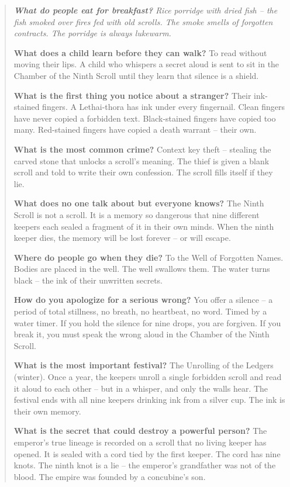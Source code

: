 \documentclass[12pt,oneside]{book}
\newenvironment{almanac}
  {\begin{quote}\small\itshape}
  {\end{quote}}
\begin{document}
\vspace{1em}
\begin{almanac}
\textbf{What do people eat for breakfast?} Rice porridge with dried fish -- the fish smoked over fires fed with old scrolls. The smoke smells of forgotten contracts. The porridge is always lukewarm.

\textbf{What does a child learn before they can walk?} To read without moving their lips. A child who whispers a secret aloud is sent to sit in the Chamber of the Ninth Scroll until they learn that silence is a shield.

\textbf{What is the first thing you notice about a stranger?} Their ink-stained fingers. A Lethai-thora has ink under every fingernail. Clean fingers have never copied a forbidden text. Black-stained fingers have copied too many. Red-stained fingers have copied a death warrant -- their own.

\textbf{What is the most common crime?} Context key theft -- stealing the carved stone that unlocks a scroll's meaning. The thief is given a blank scroll and told to write their own confession. The scroll fills itself if they lie.

\textbf{What does no one talk about but everyone knows?} The Ninth Scroll is not a scroll. It is a memory so dangerous that nine different keepers each sealed a fragment of it in their own minds. When the ninth keeper dies, the memory will be lost forever -- or will escape.

\textbf{Where do people go when they die?} To the Well of Forgotten Names. Bodies are placed in the well. The well swallows them. The water turns black -- the ink of their unwritten secrets.

\textbf{How do you apologize for a serious wrong?} You offer a silence -- a period of total stillness, no breath, no heartbeat, no word. Timed by a water timer. If you hold the silence for nine drops, you are forgiven. If you break it, you must speak the wrong aloud in the Chamber of the Ninth Scroll.

\textbf{What is the most important festival?} The Unrolling of the Ledgers (winter). Once a year, the keepers unroll a single forbidden scroll and read it aloud to each other -- but in a whisper, and only the walls hear. The festival ends with all nine keepers drinking ink from a silver cup. The ink is their own memory.

\textbf{What is the secret that could destroy a powerful person?} The emperor's true lineage is recorded on a scroll that no living keeper has opened. It is sealed with a cord tied by the first keeper. The cord has nine knots. The ninth knot is a lie -- the emperor's grandfather was not of the blood. The empire was founded by a concubine's son.
\end{almanac}
\end{document}
